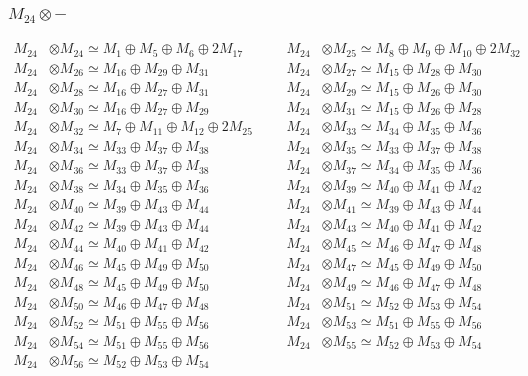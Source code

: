 \subsubsection{$ M_{24}\otimes -$}
\begin{align*}
M_{24} &\otimes M_{24} \simeq M_{1} \oplus M_{5} \oplus M_{6} \oplus 2M_{17} &&& M_{24} &\otimes M_{25} \simeq M_{8} \oplus M_{9} \oplus M_{10} \oplus 2M_{32}\\
M_{24} &\otimes M_{26} \simeq M_{16} \oplus M_{29} \oplus M_{31} &&& M_{24} &\otimes M_{27} \simeq M_{15} \oplus M_{28} \oplus M_{30}\\
M_{24} &\otimes M_{28} \simeq M_{16} \oplus M_{27} \oplus M_{31} &&& M_{24} &\otimes M_{29} \simeq M_{15} \oplus M_{26} \oplus M_{30}\\
M_{24} &\otimes M_{30} \simeq M_{16} \oplus M_{27} \oplus M_{29} &&& M_{24} &\otimes M_{31} \simeq M_{15} \oplus M_{26} \oplus M_{28}\\
M_{24} &\otimes M_{32} \simeq M_{7} \oplus M_{11} \oplus M_{12} \oplus 2M_{25} &&& M_{24} &\otimes M_{33} \simeq M_{34} \oplus M_{35} \oplus M_{36}\\
M_{24} &\otimes M_{34} \simeq M_{33} \oplus M_{37} \oplus M_{38} &&& M_{24} &\otimes M_{35} \simeq M_{33} \oplus M_{37} \oplus M_{38}\\
M_{24} &\otimes M_{36} \simeq M_{33} \oplus M_{37} \oplus M_{38} &&& M_{24} &\otimes M_{37} \simeq M_{34} \oplus M_{35} \oplus M_{36}\\
M_{24} &\otimes M_{38} \simeq M_{34} \oplus M_{35} \oplus M_{36} &&& M_{24} &\otimes M_{39} \simeq M_{40} \oplus M_{41} \oplus M_{42}\\
M_{24} &\otimes M_{40} \simeq M_{39} \oplus M_{43} \oplus M_{44} &&& M_{24} &\otimes M_{41} \simeq M_{39} \oplus M_{43} \oplus M_{44}\\
M_{24} &\otimes M_{42} \simeq M_{39} \oplus M_{43} \oplus M_{44} &&& M_{24} &\otimes M_{43} \simeq M_{40} \oplus M_{41} \oplus M_{42}\\
M_{24} &\otimes M_{44} \simeq M_{40} \oplus M_{41} \oplus M_{42} &&& M_{24} &\otimes M_{45} \simeq M_{46} \oplus M_{47} \oplus M_{48}\\
M_{24} &\otimes M_{46} \simeq M_{45} \oplus M_{49} \oplus M_{50} &&& M_{24} &\otimes M_{47} \simeq M_{45} \oplus M_{49} \oplus M_{50}\\
M_{24} &\otimes M_{48} \simeq M_{45} \oplus M_{49} \oplus M_{50} &&& M_{24} &\otimes M_{49} \simeq M_{46} \oplus M_{47} \oplus M_{48}\\
M_{24} &\otimes M_{50} \simeq M_{46} \oplus M_{47} \oplus M_{48} &&& M_{24} &\otimes M_{51} \simeq M_{52} \oplus M_{53} \oplus M_{54}\\
M_{24} &\otimes M_{52} \simeq M_{51} \oplus M_{55} \oplus M_{56} &&& M_{24} &\otimes M_{53} \simeq M_{51} \oplus M_{55} \oplus M_{56}\\
M_{24} &\otimes M_{54} \simeq M_{51} \oplus M_{55} \oplus M_{56} &&& M_{24} &\otimes M_{55} \simeq M_{52} \oplus M_{53} \oplus M_{54}\\
M_{24} &\otimes M_{56} \simeq M_{52} \oplus M_{53} \oplus M_{54}
\end{align*}

